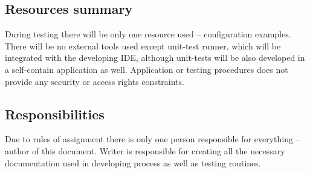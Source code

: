 \subsection{Resources summary} \label{s:introduction:resources-summary}
	\begin{comment}
		$<$Summarize the test resources, including staffing, facilities, tools, and special procedural requirements (e.g., security, access rights, and documentation control). $>$
	\end{comment}
	During testing there will be only one resource used -- configuration examples. There will be no external tools used except unit-test runner, which will be integrated with the developing IDE, although unit-tests will be also developed in a self-contain application as well. Application or testing procedures does not provide any security or access rights constraints.
\subsection{Responsibilities} \label{s:introduction:resposibilities}
	\begin{comment}
		$<$Provide an overview of the organizational content topic(s) and responsibilities for testing tasks. Identify organizational components and their primary (they are the task leader) and secondary (they are not the leader, but providing support) test-related responsibilities. $>$
	\end{comment}
	Due to rules of assignment there is only one person responsible for everything -- author of this document. Writer is responsible for creating all the necessary documentation used in developing process as well as testing routines.
